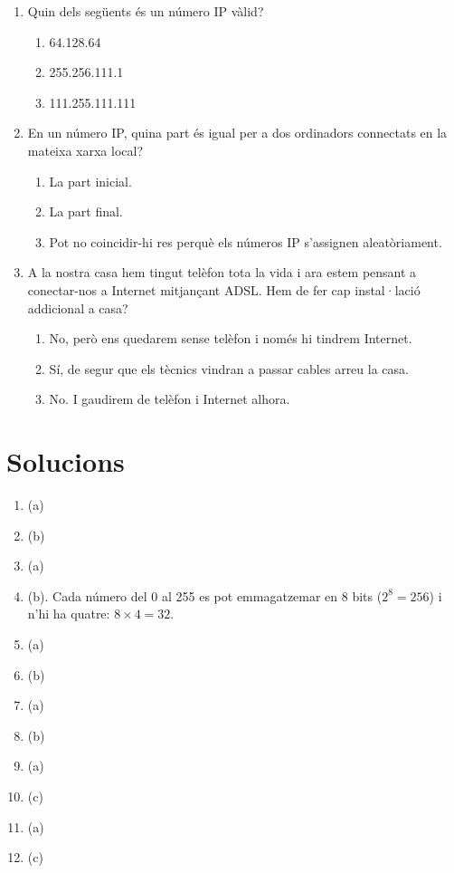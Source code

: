 \begin{enumerate}
\item Quin dels següents és un número IP vàlid?  
  \begin{enumerate}
  \item 64.128.64
  \item 255.256.111.1
  \item 111.255.111.111
  \end{enumerate}

\item En un número IP, quina part és igual per a dos ordinadors connectats en la mateixa xarxa local?
  \begin{enumerate}
  \item La part inicial.
  \item La part final.
  \item Pot no coincidir-hi res perquè els números IP s'assignen aleatòriament.
  \end{enumerate}

\item
A la nostra casa hem tingut telèfon tota la vida i ara estem pensant a conectar-nos a Internet mitjançant ADSL. Hem de fer cap instal·lació addicional a casa? 

\begin{enumerate}
\item No, però ens quedarem sense telèfon i només hi tindrem Internet.
\item Sí, de segur que els tècnics vindran a passar cables arreu la casa.
\item No. I gaudirem de telèfon i Internet alhora.
\end{enumerate}



\end{enumerate}

\section{Solucions}
\begin{enumerate}
\item (a)
\item (b)
\item (a)
\item (b). Cada número del 0 al 255 es pot emmagatzemar en 8 bits
  ($2^8=256$) i n'hi ha quatre: $8\times 4=32$.
\item (a)
\item (b)
\item (a)
\item (b)
\item (a)
\item (c)
\item (a)
\item (c)


\end{enumerate}
